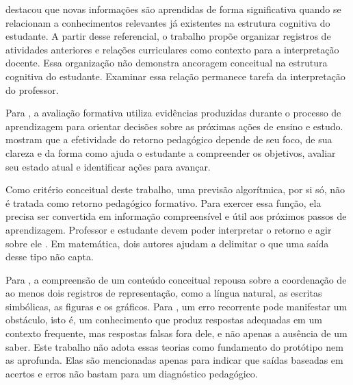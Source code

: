  destacou que novas informações são aprendidas de forma significativa quando se relacionam a conhecimentos relevantes já existentes na estrutura cognitiva do estudante. A partir desse referencial, o trabalho propõe organizar registros de atividades anteriores e relações curriculares como contexto para a interpretação docente. Essa organização não demonstra ancoragem conceitual na estrutura cognitiva do estudante. Examinar essa relação permanece tarefa da interpretação do professor.

Para , a avaliação formativa utiliza evidências produzidas durante o processo de aprendizagem para orientar decisões sobre as próximas ações de ensino e estudo.  mostram que a efetividade do retorno pedagógico depende de seu foco, de sua clareza e da forma como ajuda o estudante a compreender os objetivos, avaliar seu estado atual e identificar ações para avançar.

Como critério conceitual deste trabalho, uma previsão algorítmica, por si só, não é tratada como retorno pedagógico formativo. Para exercer essa função, ela precisa ser convertida em informação compreensível e útil aos próximos passos de aprendizagem. Professor e estudante devem poder interpretar o retorno e agir sobre ele \cite{HattieTimperley2007}. Em matemática, dois autores ajudam a delimitar o que uma saída desse tipo não capta.

Para , a compreensão de um conteúdo conceitual repousa sobre a coordenação de ao menos dois registros de representação, como a língua natural, as escritas simbólicas, as figuras e os gráficos. Para , um erro recorrente pode manifestar um obstáculo, isto é, um conhecimento que produz respostas adequadas em um contexto frequente, mas respostas falsas fora dele, e não apenas a ausência de um saber. Este trabalho não adota essas teorias como fundamento do protótipo nem as aprofunda. Elas são mencionadas apenas para indicar que saídas baseadas em acertos e erros não bastam para um diagnóstico pedagógico.

